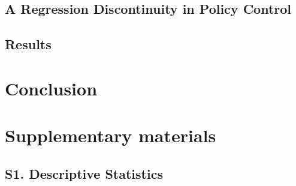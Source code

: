 \documentclass[a4paper,11pt]{article}
\newcommand{\beginsupplement}{%
	\setcounter{table}{0}
	\renewcommand{\thetable}{S.\arabic{table}}%
	\setcounter{figure}{0}
	\renewcommand{\thefigure}{S.\arabic{figure}}%
}
\begin{document}
\subsection{A Regression Discontinuity in Policy Control}

\subsection{Results}
	
\section{Conclusion}






\beginsupplement

\section{Supplementary materials}

\subsection{S1. Descriptive Statistics}

	
\end{document}
